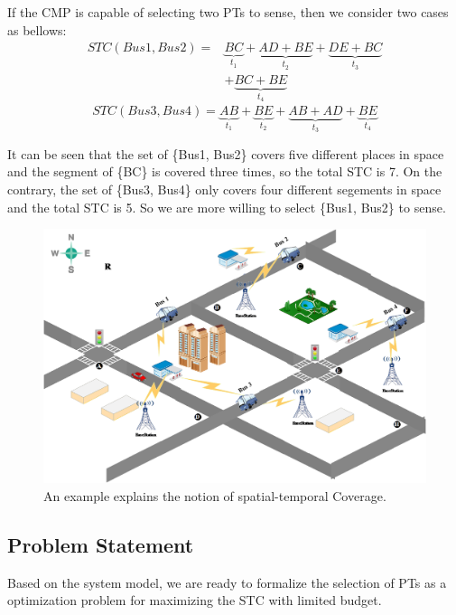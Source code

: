 \documentclass[journal]{IEEEtran}
\begin{document}
If the CMP is capable of selecting two PTs to sense, then we consider two cases as bellows:
\begin{equation}
\begin{aligned}
STC({Bus1,Bus2})=& \underset{t_{1}}{\underbrace{BC}}+\underset{t_{2}}{\underbrace{AD+BE}}+\underset{t_{3}}{\underbrace{DE+BC}}\\&+\underset{t_{4}}{\underbrace{BC+BE}}
\end{aligned}
\end{equation}
\begin{equation}
STC({Bus3,Bus4})= \underset{t_{1}}{\underbrace{AB}}+\underset{t_{2}}{\underbrace{BE}}+\underset{t_{3}}{\underbrace{AB+AD}}+\underset{t_{4}}{\underbrace{BE}}
\end{equation}

It can be seen that the set of \{Bus1, Bus2\} covers five different places in space and the segment of \{BC\} is covered three times, so the total STC is 7. On the contrary, the set of \{Bus3, Bus4\} only covers four different segements in space and the total STC is 5. So we are more willing to select \{Bus1, Bus2\} to sense.
\begin{figure}[t]
	\centering
	\includegraphics[width=1\linewidth]{Fig2(2).png}
	\caption{An example explains the notion of spatial-temporal Coverage.}
	\label{fig:figure4}
\end{figure}	

\subsection{Problem Statement} 
 Based on the system model, we are ready to formalize the selection of PTs as a optimization problem for maximizing the STC with limited budget.	
\end{document}
